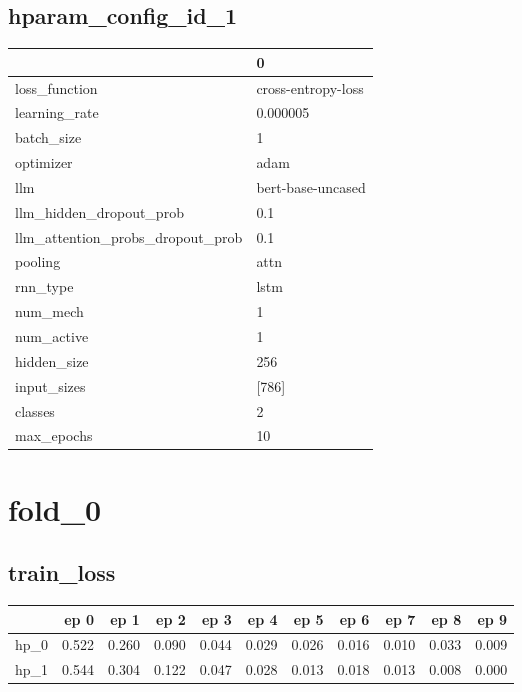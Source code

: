 \documentclass{article}
\begin{document}
\subsection{hparam\_config\_id\_1}
\begin{tabular}{ll}
\toprule
{} &                   0 \\
\midrule
loss\_function                    &  cross-entropy-loss \\
learning\_rate                    &            0.000005 \\
batch\_size                       &                   1 \\
optimizer                        &                adam \\
llm                              &   bert-base-uncased \\
llm\_hidden\_dropout\_prob          &                 0.1 \\
llm\_attention\_probs\_dropout\_prob &                 0.1 \\
pooling                          &                attn \\
rnn\_type                         &                lstm \\
num\_mech                         &                   1 \\
num\_active                       &                   1 \\
hidden\_size                      &                 256 \\
input\_sizes                      &               [786] \\
classes                          &                   2 \\
max\_epochs                       &                  10 \\
\bottomrule
\end{tabular}

\section{fold\_0}
\subsection{train\_loss}
\begin{tabular}{lrrrrrrrrrr}
\toprule
{} &   ep 0 &   ep 1 &   ep 2 &   ep 3 &   ep 4 &   ep 5 &   ep 6 &   ep 7 &   ep 8 &   ep 9 \\
\midrule
hp\_0 &  0.522 &  0.260 &  0.090 &  0.044 &  0.029 &  0.026 &  0.016 &  0.010 &  0.033 &  0.009 \\
hp\_1 &  0.544 &  0.304 &  0.122 &  0.047 &  0.028 &  0.013 &  0.018 &  0.013 &  0.008 &  0.000 \\
\bottomrule
\end{tabular}
\end{document}

